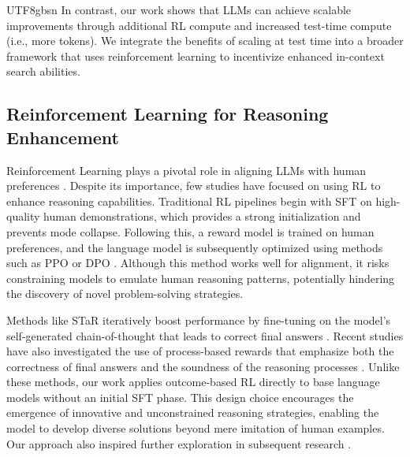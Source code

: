 \documentclass[11pt, a4paper, logo, copyright, nonumbering]{deepseek}
\begin{document}
\begin{CJK*}{UTF8}{gbsn}
In contrast, our work shows that LLMs can achieve scalable improvements through additional RL compute and increased test-time compute (i.e., more tokens). We integrate the benefits of scaling at test time into a broader framework that uses reinforcement learning to incentivize enhanced in-context search abilities.

\subsection{Reinforcement Learning for Reasoning Enhancement}

Reinforcement Learning plays a pivotal role in aligning LLMs with human preferences \citep{ouyang2022training, bai2022training}. Despite its importance, few studies have focused on using RL to enhance reasoning capabilities. Traditional RL pipelines begin with SFT on high-quality human demonstrations, which provides a strong initialization and prevents mode collapse. Following this, a reward model is trained on human preferences, and the language model is subsequently optimized using methods such as PPO \citep{schulman2017proximal} or DPO \citep{dpo}. Although this method works well for alignment, it risks constraining models to emulate human reasoning patterns, potentially hindering the discovery of novel problem-solving strategies.

Methods like STaR iteratively boost performance by fine-tuning on the model's self-generated chain-of-thought that leads to correct final answers \citep{zelikman2022star, yuan2023scaling, singh2024beyond}.
Recent studies have also investigated the use of process-based rewards that emphasize both the correctness of final answers and the soundness of the reasoning processes \citep{lightman2023let, mathshepherd,deepseekmath}.
Unlike these methods, our work applies outcome-based RL directly to base language models without an initial SFT phase. This design choice encourages the emergence of innovative and unconstrained reasoning strategies, enabling the model to develop diverse solutions beyond mere imitation of human examples.
Our approach also inspired further exploration in subsequent research \citep{tinyzero, liu2025oatzero, openr1}.


\end{CJK*}
\end{document}
